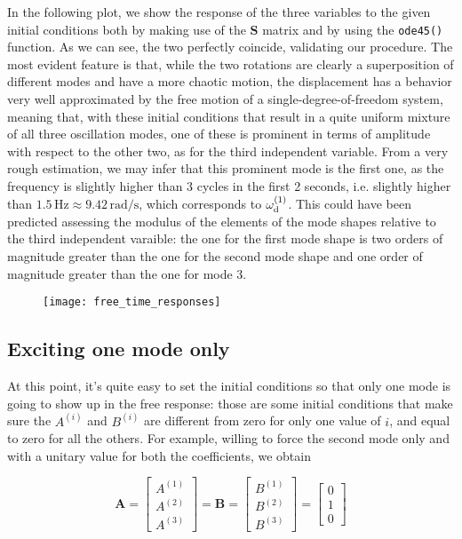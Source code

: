 \documentclass[a4paper,12pt,oneside]{article}
\begin{document}
In the following plot, we show the response of the three variables to the given initial conditions both by making use of the $ \mathbf{S} $ matrix and by using the  \lstinline!ode45()! function. As we can see, the two perfectly coincide, validating our procedure. The most evident feature is that, while the two rotations are clearly a superposition of different modes and have a more chaotic motion, the displacement has a behavior very well approximated by the free motion of a single-degree-of-freedom system, meaning that, with these initial conditions that result in a quite uniform mixture of all three oscillation modes, one of these is prominent in terms of amplitude with respect to the other two, as for the third independent variable. From a very rough estimation, we may infer that this prominent mode is the first one, as the frequency is slightly higher than 3 cycles in the first 2 seconds, i.e. slightly higher than $ 1.5 \, \text{Hz} \approx 9.42 \, \text{rad/s} $, which corresponds to $ \omega_\textup{d}^{(1)} $. This could have been predicted assessing the modulus of the elements of the mode shapes relative to the third independent varaible: the one for the first mode shape is two orders of magnitude greater than the one for the second mode shape and one order of magnitude greater than the one for mode 3.

\begin{figure}[h]
	\hspace{-70pt}
	\texttt{[image: free\_time\_responses]}
\end{figure}


\subsection{Exciting one mode only}
\label{subs:mode_2_excitation}

At this point, it's quite easy to set the initial conditions so that only one mode is going to show up in the free response: those are some initial conditions that make sure the $ A^{(i)} $ and $ B^{(i)} $ are different from zero for only one value of $ i $, and equal to zero for all the others. For example, willing to force the second mode only and with a unitary value for both the coefficients, we obtain

\[
	\mathbf{A} = \begin{bmatrix}
									A^{(1)} \\
									A^{(2)} \\
									A^{(3)}
								\end{bmatrix} = \mathbf{B} =	\begin{bmatrix}
																								B^{(1)} \\
																								B^{(2)} \\
																								B^{(3)}
																							\end{bmatrix} = \begin{bmatrix}
																																0 \\
																																1 \\
																																0
																															\end{bmatrix}
\]
\end{document}
